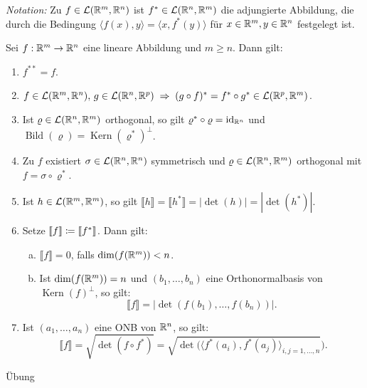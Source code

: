\documentclass[a4paper,twoside,DIV15,BCOR12mm]{scrbook}
\newcommand{\id}{\mathrm{id}}
\DeclareMathOperator{\Kern}{Kern}
\DeclareMathOperator{\Bild}{Bild}
\begin{document}
\emph{Notation:} Zu \(f \in \mathcal{L}(\mathbb{R}^m,\mathbb{R}^n)\) ist \(f^* \in \mathcal{L}(\mathbb{R}^n,\mathbb{R}^m)\) die adjungierte Abbildung, die 
durch die Bedingung \(\langle f(x),y\rangle = \langle x,f^*(y)\rangle\) für \(x\in\mathbb{R}^m, y\in\mathbb{R}^n\) 
festgelegt ist.

\begin{lemma}\label{lem:3.12}
Sei \(f:\mathbb{R}^m\to\mathbb{R}^n\) eine lineare Abbildung und \(m\geq n\). Dann gilt:
\begin{enumerate}[(1)]
\item \(f^{**} = f\).
\item \(f\in\mathcal{L}(\mathbb{R}^m,\mathbb{R}^n),\, g\in\mathcal{L}(\mathbb{R}^n,\mathbb{R}^p) \; \Rightarrow \; (g\circ f)^* = f^* \circ g^* \in \mathcal{L}(\mathbb{R}^p,\mathbb{R}^m)\).
\item Ist \(\varrho \in \mathcal{L}(\mathbb{R}^n,\mathbb{R}^m)\) orthogonal, so gilt \(\varrho^* \circ \varrho = \id_{\MdR^n}\) und \(\Bild(\varrho) = \Kern(\varrho^*)^\perp\).
\item Zu \(f\) existiert \(\sigma \in \mathcal{L}(\mathbb{R}^n,\mathbb{R}^n)\) symmetrisch und \(\varrho\in \mathcal{L}(\mathbb{R}^n,\mathbb{R}^m)\) orthogonal mit \(f = \sigma \circ \varrho^*\).
\item Ist \(h \in \mathcal{L}(\mathbb{R}^m,\mathbb{R}^m)\), so gilt \(\llbracket h \rrbracket = \llbracket h^* \rrbracket = |\det(h)| = |\det(h^*)|\).
\item Setze \(\llbracket f \rrbracket \da \llbracket f^* \rrbracket\). Dann gilt:
	\begin{enumerate}[(a)]
	\item \(\llbracket f \rrbracket = 0\), falls \(\dim(f(\mathbb{R}^m)) < n\).
	\item Ist \(\dim(f(\mathbb{R}^m)) = n\) und \((b_1,\dots,b_n)\) eine Orthonormalbasis von \(\Kern(f)^\perp\), so gilt:
\[
\llbracket f \rrbracket = |\det(f(b_1),\dots,f(b_n))|.
\]
	\end{enumerate}
\item Ist \((a_1,\dots,a_n)\) eine ONB von \(\mathbb{R}^n\), so gilt:
\[
\llbracket f \rrbracket = \sqrt{\det(f\circ f^*)} = \sqrt{
\det(\langle f^*(a_i),f^*(a_j)\rangle_{i,j=1,\dots,n}}).
\]
\end{enumerate}
\end{lemma}
\begin{beweis}
Übung
\end{beweis}
\end{document}
